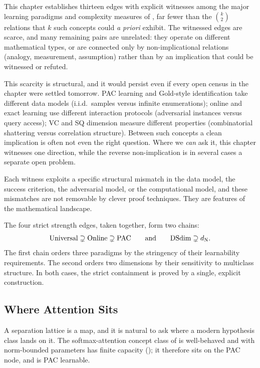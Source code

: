 \begin{remark}
\label{thm:sparsity}
This chapter establishes thirteen edges with explicit witnesses among the
major learning paradigms and complexity measures of
, far fewer than the $\binom{k}{2}$ relations
that $k$ such concepts could \emph{a priori} exhibit. The witnessed edges
are scarce, and many remaining pairs are unrelated: they operate on
different mathematical types, or are connected only by non-implicational
relations (analogy, measurement, assumption) rather than by an implication
that could be witnessed or refuted.
\end{remark}

This scarcity is structural, and it would persist even if every open
census in the chapter were settled tomorrow. PAC learning and Gold-style
identification take different data models (i.i.d.\ samples versus infinite
enumerations); online and exact learning use different interaction
protocols (adversarial instances versus query access); VC and SQ dimension
measure different properties (combinatorial shattering versus correlation
structure). Between such concepts a clean implication is often not even the
right question. Where we \emph{can} ask it, this chapter witnesses one
direction, while the reverse non-implication is in several cases a separate
open problem.

Each witness exploits a specific structural mismatch in the data model,
the success criterion, the adversarial model, or the computational model,
and these mismatches are not removable by clever proof techniques. They
are features of the mathematical landscape.

The four strict strength edges, taken together, form two chains:
\[
\text{Universal} \supsetneq \text{Online} \supsetneq \text{PAC}
\qquad \text{and} \qquad
\mathrm{DSdim} \supsetneq d_{\mathrm{N}}.
\]
The first chain orders three paradigms by the stringency of their
learnability requirements. The second orders two dimensions by their
sensitivity to multiclass structure. In both cases, the strict
containment is proved by a single, explicit construction.


\subsection{Where Attention Sits}
\label{sec:attention-lattice}

A separation lattice is a map, and it is natural to ask where a modern
hypothesis class lands on it. The softmax-attention concept class of
 is well-behaved
and with norm-bounded parameters has finite capacity
(); it therefore sits on the PAC node, and
is PAC learnable.

